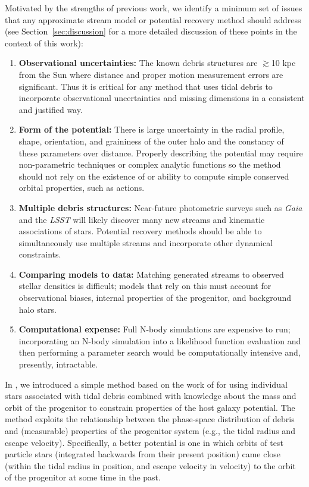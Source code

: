 \documentclass[letterpaper,12pt,preprint]{aastex}
\newcommand{\project}[1]{\textsl{#1}}
\newcommand{\gaia}{\project{Gaia}}
\begin{document}
Motivated by the strengths of previous work, we identify a minimum set of issues that any approximate stream model or potential recovery method should address (see Section~\ref{sec:discussion} for a more detailed discussion of these points in the context of this work):
\begin{enumerate}
	\item \textbf{Observational uncertainties:} The known debris structures are $\gtrsim$10 kpc from the Sun where distance and proper motion measurement errors are significant. Thus it is critical for any method that uses tidal debris to incorporate observational uncertainties and missing dimensions in a consistent and justified way. 
	\item \textbf{Form of the potential:} There is large uncertainty in the radial profile, shape, orientation, and graininess of the outer halo and the constancy of these parameters over distance. Properly describing the potential may require non-parametric techniques or complex analytic functions so the method should not rely on the existence of or ability to compute simple conserved orbital properties, such as actions.
	\item \textbf{Multiple debris structures:} Near-future photometric surveys such as \gaia\, and the \project{LSST} will likely discover many new streams and kinematic associations of stars. Potential recovery methods should be able to simultaneously use multiple streams and incorporate other dynamical constraints.
	\item \textbf{Comparing models to data:} Matching generated streams to observed stellar densities is difficult; models that rely on this must account for observational biases, internal properties of the progenitor, and background halo stars. 
	\item \textbf{Computational expense:} Full N-body simulations are expensive to run; incorporating an N-body simulation into a likelihood function evaluation and then performing a parameter search would be computationally intensive and, presently, intractable.
\end{enumerate}

In \citet{apw13}, we introduced a simple method based on the work of \citet{johnston99a} for using individual stars associated with tidal debris combined with knowledge about the mass and orbit of the progenitor to constrain properties of the host galaxy potential. The method exploits the relationship between the phase-space distribution of debris and (measurable) properties of the progenitor system (e.g., the tidal radius and escape velocity).  Specifically, a better potential is one in which orbits of test particle stars (integrated backwards from their present position) came close (within the tidal radius in position, and escape velocity in velocity) to the orbit of the progenitor at some time in the past. 
\end{document}
